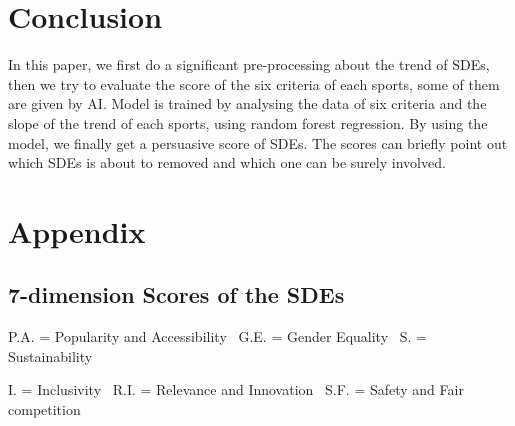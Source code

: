 \documentclass[a4paper]{article}
\begin{document}
\section{Conclusion}
In this paper, we first do a significant pre-processing about the trend of SDEs, then we try to evaluate the score of the six criteria of each sports, some of them are given by AI. Model is trained by analysing the data of six criteria and the slope of the trend of each sports, using random forest regression. By using the model, we finally get a persuasive score of SDEs. The scores can briefly point out which SDEs is about to removed and which one can be surely involved.
\section{Appendix}

\subsection{7-dimension Scores of the SDEs}
P.A. = Popularity and Accessibility \ G.E. = Gender Equality \ S. = Sustainability

I. = Inclusivity \ R.I. = Relevance and Innovation \ S.F. = Safety and Fair competition
\end{document}
